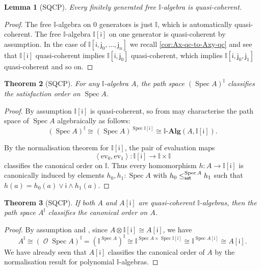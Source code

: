 \documentclass[a4paper,12pt]{amsart}
\newtheorem{theorem}{Theorem}[section]
\newtheorem{lemma}[theorem]{Lemma}
\theoremstyle{definition}
\newcommand{\mc}[1]{\mathcal{#1}}
\newcommand{\mb}[1]{\mathbf{#1}}
\newcommand{\mbb}[1]{\mathbb{#1}}
\newcommand{\I}{\mbb I}
\newcommand{\ms}[1]{\mathsf{#1}}
\newcommand{\alg}{\text{-}\mb{Alg}}
\newcommand{\pair}[1]{\left\langle#1\right\rangle}
\newcommand{\ev}{\mathrm{ev}}
\newcommand{\spec}{\operatorname{Spec}}
\newcommand{\opens}{\operatorname{\mc{O}}} %
\begin{document}
\begin{lemma}[SQCP]\label{lem:fg-qc}
  Every finitely generated free $\I$-algebra is quasi-coherent.
\end{lemma}

\begin{proof}
  The free $\I$-algebra on $0$ generators is just $\I$, which is automatically quasi-coherent. The free $\I$-algebra $\I[\ms{i}]$ on one generator is quasi-coherent by assumption. In the case of $\I[\ms{i},\ms{j}_0,\ldots,\ms{j}_n]$ we recall \cref{cor:Ax-qc-to-Axy-qc} and see that $\I[\ms{i}]$ quasi-coherent implies $\I[\ms{i},\ms{j}_0]$ quasi-coherent, which implies $\I[\ms{i},\ms{j}_0,\ms{j}_1]$ quasi-coherent and so on.
\end{proof}


\begin{theorem}[SQCP]\label{thm:phoa-spectrum}
  For any $\I$-algebra $A$, the path space ${(\spec A)}^\I$ classifies the satisfaction order on $\spec A$.
\end{theorem}
\begin{proof}
  By assumption $\I[\ms{i}]$ is quasi-coherent, so from  may characterise the path space of $\spec{A}$ algebraically as follows:
  \[ (\spec A)^\I \cong (\spec{A})^{\spec{\I[\ms{i}]}}\cong \I\alg(A,\I[\ms{i}])\text{.} \]
  
  By the normalisation theorem for $\I[\ms{i}]$, the pair of evaluation maps
  \[ \pair{\ev_0,\ev_1} \colon \I[\ms{i}] \to \I \times \I \]
  classifies the canonical order on $\I$.
  Thus every homomorphism $h\colon A\to \I[\ms{i}]$ is canonically induced by elements $h_0,h_1:\spec{A}$ with $h_0\satle[\spec{A}] h_1$ such that $h(a) = h_0(a) \vee \ms{i} \wedge h_1(a)$.
\end{proof}


\begin{theorem}[SQCP]\label{thm:algebraphoa}
  If both $A$ and $A[\ms{i}]$ are quasi-coherent $\I$-algebras, then the path space $A^\I$ classifies the canonical order on $A$.
\end{theorem}
\begin{proof}
  By assumption and , since $A \otimes \I[\ms{i}] \cong A[\ms{i}]$, we have
  \[ A^\I \cong (\opens{\spec A})^\I = (\I^{\spec A})^\I \cong \I^{\spec A \times \spec\I[\ms{i}]} \cong \I^{\spec A[\ms{i}]} \cong A[\ms{i}]\text{.} \]
  We have already seen that $A[\ms{i}]$ classifies the canonical order of $A$ by the normalisation result for polynomial $\I$-algebras.
\end{proof}
\end{document}
